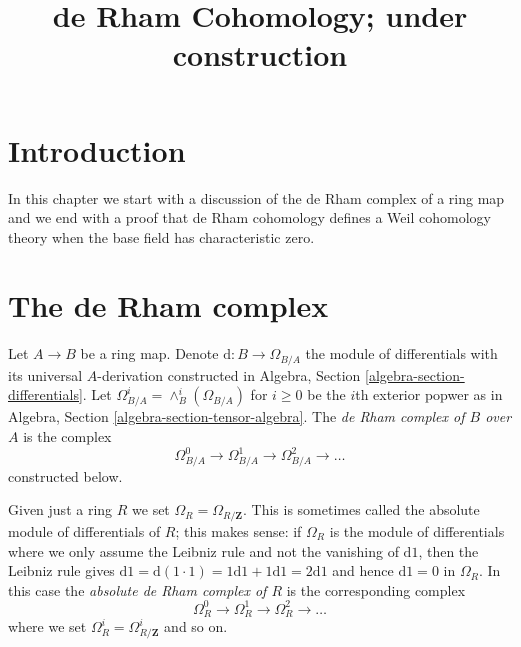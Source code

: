 

%


\title{de Rham Cohomology; under construction}


\maketitle

\label{section-phantom}

\tableofcontents

\section{Introduction}
\label{section-introduction}

\noindent
In this chapter we start with a discussion of the de Rham complex
of a ring map and we end with a proof that de Rham cohomology
defines a Weil cohomology theory when the base field has characteristic zero.




\section{The de Rham complex}
\label{section-de-rham-complex}

\noindent
Let $A \to B$ be a ring map. Denote $\text{d} : B \to \Omega_{B/A}$
the module of differentials with its universal $A$-derivation
constructed in Algebra, Section \ref{algebra-section-differentials}.
Let $\Omega_{B/A}^i = \wedge^i_B(\Omega_{B/A})$ for $i \geq 0$ be the
$i$th exterior popwer as in
Algebra, Section \ref{algebra-section-tensor-algebra}.
The {\it de Rham complex of $B$ over $A$} is the complex
$$
\Omega_{B/A}^0 \to \Omega_{B/A}^1 \to \Omega_{B/A}^2 \to \ldots
$$
constructed below.

\medskip\noindent
Given just a ring $R$ we set $\Omega_R = \Omega_{R/\mathbf{Z}}$.
This is sometimes called the absolute module of differentials of $R$;
this makes sense: if $\Omega_R$ is the module of differentials
where we only assume the Leibniz rule and not the vanishing of $\text{d}1$,
then the Leibniz rule gives $\text{d}1 = \text{d}(1 \cdot 1) =
1 \text{d}1 + 1 \text{d}1 = 2 \text{d}1$ and hence
$\text{d}1 = 0$ in $\Omega_R$. In this case the
{\it absolute de Rham complex of $R$} is the corresponding complex
$$
\Omega_R^0 \to \Omega_R^1 \to \Omega_R^2 \to \ldots
$$
where we set $\Omega^i_R = \Omega^i_{R/\mathbf{Z}}$ and so on.

